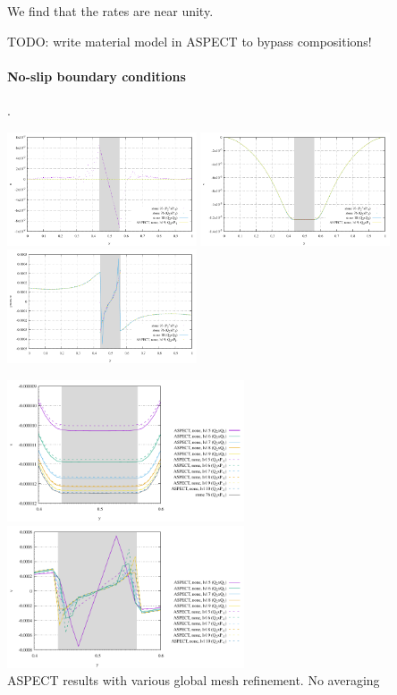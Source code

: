 We find that the rates are near unity.


TODO: write material model in ASPECT to bypass compositions! 



\newpage
\paragraph{No-slip boundary conditions}.

\begin{center}
\includegraphics[width=5.6cm]{images/sinking_block/u_NS}
\includegraphics[width=5.6cm]{images/sinking_block/v_NS}
\includegraphics[width=5.6cm]{images/sinking_block/pressure_NS}
\end{center}

\begin{center}
\includegraphics[width=7cm]{images/sinking_block/v_NS_ASPECT_56789}
\includegraphics[width=7cm]{images/sinking_block/pressure_NS_ASPECT_56789}\\
{\captionfont ASPECT results with various global mesh refinement. No averaging}
\end{center}

